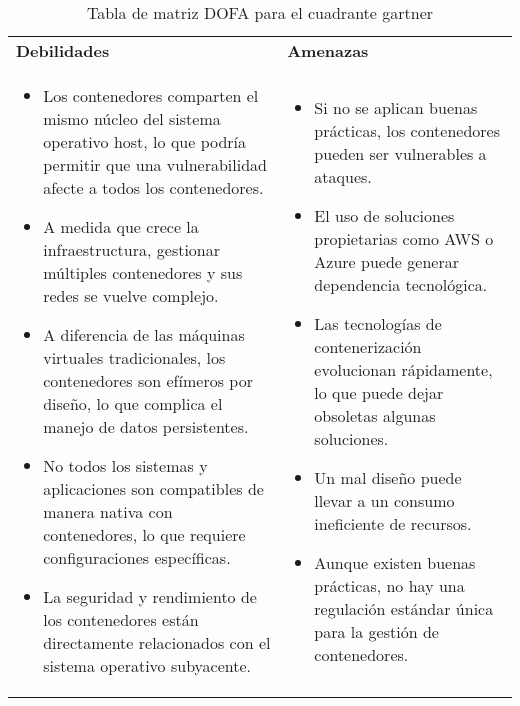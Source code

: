 \begin{table}[H]
\begin{tabularx}{\textwidth}{|X|X|}
\begin{minipage}[t]{\linewidth}
\end{minipage}
\\
\hline
\textbf{Debilidades} & \textbf{Amenazas} \\
\hline
\begin{minipage}[t]{\linewidth}
\vspace{2pt}
\begin{itemize}
    \setlength\itemsep{0pt}
    \setlength\parskip{0pt}
    \setlength\parsep{0pt}
    \item Los contenedores comparten el mismo núcleo del sistema operativo host, lo que podría permitir que una vulnerabilidad afecte a todos los contenedores.
    \item A medida que crece la infraestructura, gestionar múltiples contenedores y sus redes se vuelve complejo.
    \item A diferencia de las máquinas virtuales tradicionales, los contenedores son efímeros por diseño, lo que complica el manejo de datos persistentes.
    \item No todos los sistemas y aplicaciones son compatibles de manera nativa con contenedores, lo que requiere configuraciones específicas.
    \item La seguridad y rendimiento de los contenedores están directamente relacionados con el sistema operativo subyacente.
\end{itemize}
\vspace{2pt}
\end{minipage}
&
\begin{minipage}[t]{\linewidth}
\vspace{2pt}
\begin{itemize}
    \setlength\itemsep{0pt}
    \setlength\parskip{0pt}
    \setlength\parsep{0pt}
    \item Si no se aplican buenas prácticas, los contenedores pueden ser vulnerables a ataques.
    \item El uso de soluciones propietarias como AWS o Azure puede generar dependencia tecnológica.
    \item Las tecnologías de contenerización evolucionan rápidamente, lo que puede dejar obsoletas algunas soluciones.
    \item Un mal diseño puede llevar a un consumo ineficiente de recursos.
    \item Aunque existen buenas prácticas, no hay una regulación estándar única para la gestión de contenedores.
\end{itemize}
\vspace{2pt}
\end{minipage}
\\
\hline
\end{tabularx}
\caption{Tabla de matriz DOFA para el cuadrante gartner}
\label{tab:matriz-dofa}
\end{table}